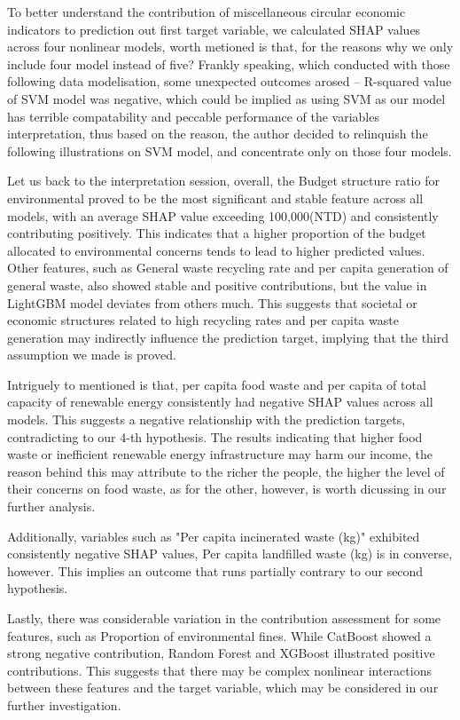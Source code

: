\documentclass{article}
\begin{document}
To better understand the contribution of miscellaneous circular economic indicators to prediction out first target variable, we calculated SHAP values across four nonlinear models, worth metioned is that, for the reasons why we only include four model instead of five?
Frankly speaking, which conducted with those following data modelisation, some unexpected outcomes arosed -- R-squared value of SVM model was negative, which could be implied as using SVM as our model has terrible compatability and peccable performance of the variables interpretation, thus based on the reason, the author decided to relinquish the following illustrations on SVM model, and concentrate only on those four models.

Let us back to the interpretation session, overall, the Budget structure ratio for environmental proved to be the most significant and stable feature across all models, with an average SHAP value exceeding 100,000(NTD) and consistently contributing positively. This indicates that a higher proportion of the budget allocated to environmental concerns tends to lead to higher predicted values.
Other features, such as General waste recycling rate and per capita generation of general waste, also showed stable and positive contributions, but the value in LightGBM model deviates from others much. 
This suggests that societal or economic structures related to high recycling rates and per capita waste generation may indirectly influence the prediction target, implying that the third assumption we made is proved.

Intriguely to mentioned is that, per capita food waste and per capita of total capacity of renewable energy consistently had negative SHAP values across all models. 
This suggests a negative relationship with the prediction targets, contradicting to our 4-th hypothesis. 
The results indicating that higher food waste or inefficient renewable energy infrastructure may harm our income, the reason behind this may attribute to the richer the people, the higher the level of their concerns on food waste, as for the other, however, is worth dicussing in our further analysis.

Additionally, variables such as "Per capita incinerated waste (kg)" exhibited consistently negative SHAP values, Per capita landfilled waste (kg) is in converse, however. 
This implies an outcome that runs partially contrary to our second hypothesis.

Lastly, there was considerable variation in the contribution assessment for some features, such as Proportion of environmental fines. While CatBoost showed a strong negative contribution, Random Forest and XGBoost illustrated positive contributions. This suggests that there may be complex nonlinear interactions between these features and the target variable, which may be considered in our further investigation.
\end{document}
